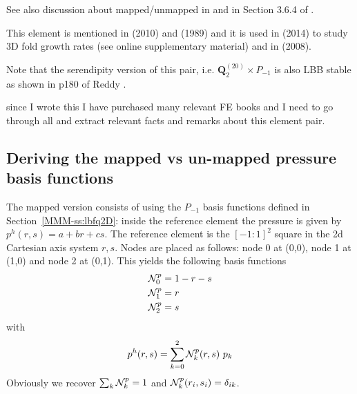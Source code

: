 See also discussion about mapped/unmapped in \textcite{bobf13} and 
in Section 3.6.4 of \textcite{john16}.

This element is mentioned in \textcite{kaus10} (2010) and \textcite{pefc89} (1989) 
and it is used in \textcite{freh14} (2014) to study 3D fold growth rates 
(see online supplementary material) and in \textcite{schm08} (2008).

Note that the serendipity version of this pair, 
i.e. ${\bm Q}_2^{(20)}\times P_{-1}$ is also LBB stable
as shown in p180 of Reddy \cite{reddybook2}.

{\color{red} since I wrote this I have purchased many relevant FE books
and I need to go through all and extract relevant facts and remarks about 
this element pair.}


\subsection*{Deriving the mapped vs un-mapped pressure basis functions}

The mapped version consists of  
using the $P_{-1}$ basis functions defined in Section~\ref{MMM-ss:lbfq2D}:
inside the reference element the pressure is given by $p^h(r,s)=a+br+cs$.
The reference element is the $[-1:1]^2$ square in the 2d Cartesian axis
system $r,s$.
Nodes are placed as follows: node 0 at (0,0), node 1 at (1,0) and node 2 at (0,1).
This yields the following basis functions
\begin{align}
{\mathcal{N}}_0^p &= 1-r-s \nonumber\\
{\mathcal{N}}_1^p &= r \nonumber\\
{\mathcal{N}}_2^p &= s \nonumber
\end{align}
with 
\[
p^h(r,s) = \sum_{k=0}^2 {\mathcal{N}}_k^p(r,s) \ p_k
\]
Obviously we recover $\sum_k {\mathcal{N}}_k^p = 1$ and ${\mathcal{N}}_k^p(r_i,s_i)=\delta_{ik}$.


